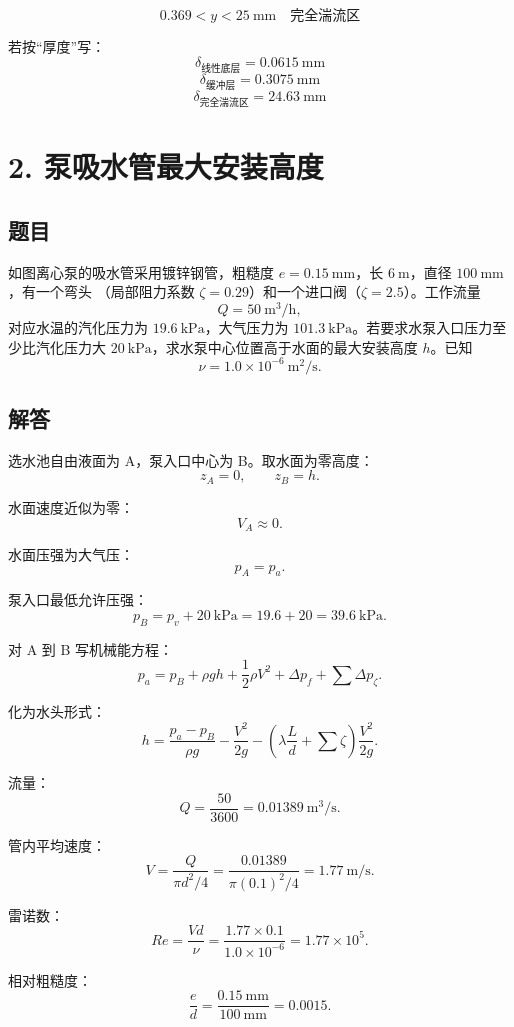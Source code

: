 ﻿\documentclass[11pt,a4paper]{ctexart}
\begin{document}
\[
\boxed{0.369<y<25\ \mathrm{mm}\quad\text{完全湍流区}}
\]

若按“厚度”写：
\[
\boxed{\delta_{\text{线性底层}}=0.0615\ \mathrm{mm}}
\]
\[
\boxed{\delta_{\text{缓冲层}}=0.3075\ \mathrm{mm}}
\]
\[
\boxed{\delta_{\text{完全湍流区}}=24.63\ \mathrm{mm}}
\]

\section*{2. 泵吸水管最大安装高度}

\subsection*{题目}

如图离心泵的吸水管采用镀锌钢管，粗糙度 \(e=0.15\ \mathrm{mm}\)，长 \(6\ \mathrm{m}\)，直径 \(100\ \mathrm{mm}\)，有一个弯头
（局部阻力系数 \(\zeta=0.29\)）和一个进口阀（\(\zeta=2.5\)）。工作流量
\[
Q=50\ \mathrm{m^3/h},
\]
对应水温的汽化压力为 \(19.6\ \mathrm{kPa}\)，大气压力为 \(101.3\ \mathrm{kPa}\)。若要求水泵入口压力至少比汽化压力大 \(20\ \mathrm{kPa}\)，求水泵中心位置高于水面的最大安装高度 \(h\)。已知
\[
\nu=1.0\times10^{-6}\ \mathrm{m^2/s}.
\]

\subsection*{解答}

选水池自由液面为 A，泵入口中心为 B。取水面为零高度：
\[
z_A=0,\qquad z_B=h.
\]

水面速度近似为零：
\[
V_A\approx0.
\]

水面压强为大气压：
\[
p_A=p_a.
\]

泵入口最低允许压强：
\[
p_B=p_v+20\ \mathrm{kPa}=19.6+20=39.6\ \mathrm{kPa}.
\]

对 A 到 B 写机械能方程：
\[
p_a=p_B+\rho gh+\frac12\rho V^2+\Delta p_f+\sum\Delta p_\zeta.
\]

化为水头形式：
\[
h=\frac{p_a-p_B}{\rho g}
-\frac{V^2}{2g}
-\left(\lambda\frac{L}{d}+\sum\zeta\right)\frac{V^2}{2g}.
\]

流量：
\[
Q=\frac{50}{3600}=0.01389\ \mathrm{m^3/s}.
\]

管内平均速度：
\[
V=\frac{Q}{\pi d^2/4}
=\frac{0.01389}{\pi(0.1)^2/4}
=1.77\ \mathrm{m/s}.
\]

雷诺数：
\[
Re=\frac{Vd}{\nu}
=\frac{1.77\times0.1}{1.0\times10^{-6}}
=1.77\times10^5.
\]

相对粗糙度：
\[
\frac{e}{d}=\frac{0.15\ \mathrm{mm}}{100\ \mathrm{mm}}=0.0015.
\]
\end{document}
